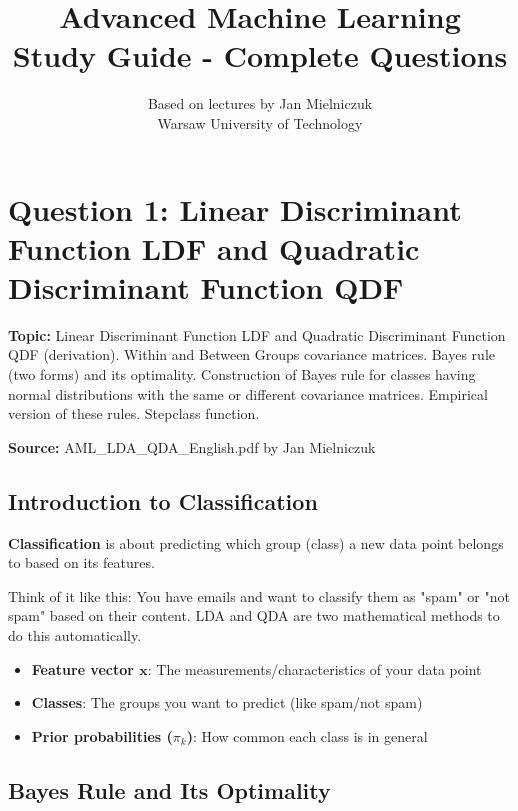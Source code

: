 \documentclass[12pt,a4paper]{article}
\title{\textbf{Advanced Machine Learning} \\ 
       \Large Study Guide - Complete Questions}
\author{Based on lectures by Jan Mielniczuk \\ Warsaw University of Technology}
\date{}
\begin{document}
\maketitle

\tableofcontents
\newpage

\section{Question 1: Linear Discriminant Function LDF and Quadratic Discriminant Function QDF}

\textbf{Topic:} Linear Discriminant Function LDF and Quadratic Discriminant Function QDF (derivation). Within and Between Groups covariance matrices. Bayes rule (two forms) and its optimality. Construction of Bayes rule for classes having normal distributions with the same or different covariance matrices. Empirical version of these rules. Stepclass function.

\textbf{Source:} AML\_LDA\_QDA\_English.pdf by Jan Mielniczuk

\subsection{Introduction to Classification}

\textbf{Classification} is about predicting which group (class) a new data point belongs to based on its features.

Think of it like this: You have emails and want to classify them as "spam" or "not spam" based on their content. LDA and QDA are two mathematical methods to do this automatically.

\begin{tcolorbox}[colback=blue!5!white,colframe=blue!75!black,title=Key Concepts]
\begin{itemize}
    \item \textbf{Feature vector $\mathbf{x}$}: The measurements/characteristics of your data point
    \item \textbf{Classes}: The groups you want to predict (like spam/not spam)
    \item \textbf{Prior probabilities ($\pi_k$)}: How common each class is in general
\end{itemize}
\end{tcolorbox}

\subsection{Bayes Rule and Its Optimality}
\end{document}
